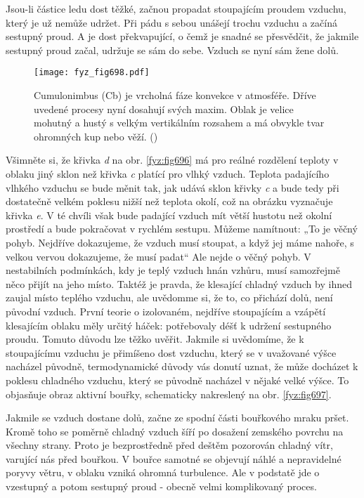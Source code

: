     Jsou-li částice ledu dost těžké, začnou propadat stoupajícím proudem vzduchu, který je už nemůže
    udržet. Při pádu s sebou unášejí trochu vzduchu a začíná sestupný proud. A je dost překvapující,
    o čemž je snadné se přesvědčit, že jakmile sestupný proud začal, udržuje se sám do sebe. Vzduch
    se nyní sám žene dolů.

    \begin{figure}[ht!] %
      \centering
      \texttt{[image: fyz\_fig698.pdf]}
      \caption{Cumulonimbus (Cb) je vrcholná fáze konvekce v atmosféře. Dříve uvedené procesy nyní
               dosahují svých maxim. Oblak je velice mohutný a hustý s velkým vertikálním rozsahem a
               má obvykle tvar ohromných kup nebo věží. (\cite[s.~707]{Feynman02})}
      \label{fyz:fig698}
    \end{figure}

    Všimněte si, že křivka \emph{d} na obr. \ref{fyz:fig696} má pro reálné rozdělení teploty v
    oblaku jiný sklon než křivka \emph{c} platící pro vlhký vzduch. Teplota padajícího vlhkého
    vzduchu se bude měnit tak, jak udává sklon křivky \emph{c} a bude tedy při dostatečně velkém
    poklesu nižší než teplota okolí, což na obrázku vyznačuje křivka \emph{e}. V té chvíli však bude
    padající vzduch mít větší hustotu než okolní prostředí a bude pokračovat v rychlém sestupu.
    Můžeme namítnout: „To je věčný pohyb. Nejdříve dokazujeme, že vzduch musí stoupat, a když jej
    máme nahoře, s velkou vervou dokazujeme, že musí padat“ Ale nejde o věčný pohyb. V nestabilních
    podmínkách, kdy je teplý vzduch hnán vzhůru, musí samozřejmě něco přijít na jeho místo. Taktéž
    je pravda, že klesající chladný vzduch by ihned zaujal místo teplého vzduchu, ale uvědomme si,
    že to, co přichází dolů, není původní vzduch. První teorie o izolovaném, nejdříve stoupajícím a
    vzápětí klesajícím oblaku měly určitý háček: potřebovaly déšť k udržení sestupného proudu.
    Tomuto důvodu lze těžko uvěřit. Jakmile si uvědomíme, že k stoupajícímu vzduchu je přimíšeno
    dost vzduchu, který se v uvažované výšce nacházel původně, termodynamické důvody vás donutí
    uznat, že může docházet k poklesu chladného vzduchu, který se původně nacházel v nějaké velké
    výšce. To objasňuje obraz aktivní bouřky, schematicky nakreslený na obr. \ref{fyz:fig697}.

    Jakmile se vzduch dostane dolů, začne ze spodní části bouřkového mraku pršet. Kromě toho 
    se poměrně chladný vzduch šíří po dosažení zemského povrchu na všechny strany. Proto je
    bezprostředně před deštěm pozorován chladný vítr, varující nás před bouřkou. V bouřce samotné se
    objevují náhlé a nepravidelné poryvy větru, v oblaku vzniká ohromná turbulence. Ale v podstatě
    jde o vzestupný a potom sestupný proud - obecně velmi komplikovaný proces.

